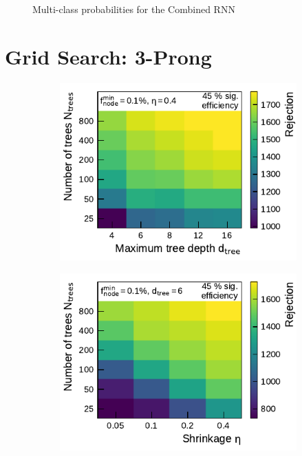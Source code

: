 \begin{figure}[!ht]
\begin{subfigure}{0.48\textwidth}
  \end{subfigure}%

  \caption{Multi-class probabilities for the Combined RNN}
  \label{fig:rnn_multiclass_proba_combined}
\end{figure}

\clearpage
\section{Grid Search: 3-Prong}
\label{app:grid_search_3p}

\begin{figure}[htbp]
  \begin{subfigure}[t]{0.48\textwidth}
    \centering
    \includegraphics{./figures/bdt_perf/gridsearch_3p/scan_MaxDepth_NTrees.pdf}
    \subcaption{}
  \end{subfigure}\hfill
  \begin{subfigure}[t]{0.48\textwidth}
    \centering
    \includegraphics{./figures/bdt_perf/gridsearch_3p/scan_Shrinkage_NTrees.pdf}

\end{subfigure}
\end{figure}
